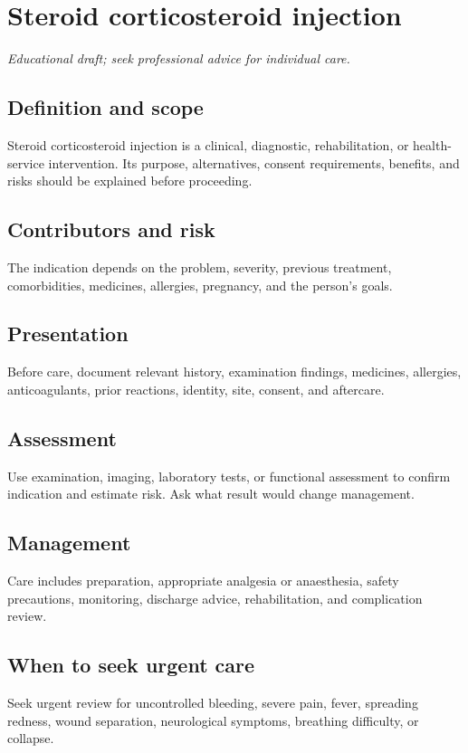 \chapter{Steroid corticosteroid injection}
\medskip
\noindent\textit{Educational draft; seek professional advice for individual care.}

\section*{Definition and scope}
Steroid corticosteroid injection is a clinical, diagnostic, rehabilitation, or health-service intervention. Its purpose, alternatives, consent requirements, benefits, and risks should be explained before proceeding.

\section*{Contributors and risk}
The indication depends on the problem, severity, previous treatment, comorbidities, medicines, allergies, pregnancy, and the person’s goals.

\section*{Presentation}
Before care, document relevant history, examination findings, medicines, allergies, anticoagulants, prior reactions, identity, site, consent, and aftercare.

\section*{Assessment}
Use examination, imaging, laboratory tests, or functional assessment to confirm indication and estimate risk. Ask what result would change management.

\section*{Management}
Care includes preparation, appropriate analgesia or anaesthesia, safety precautions, monitoring, discharge advice, rehabilitation, and complication review.

\section*{When to seek urgent care}
Seek urgent review for uncontrolled bleeding, severe pain, fever, spreading redness, wound separation, neurological symptoms, breathing difficulty, or collapse.

